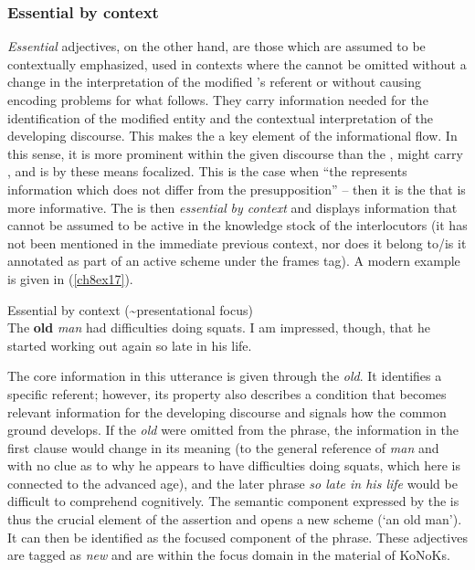\documentclass[output=paper,colorlinks,citecolor=brown]{langscibook}
\begin{document}
\subsubsection{Essential by context}\label{ch8s3.4.2}
\emph{Essential} adjectives, on the other hand, are those which are
assumed to be contextually emphasized, used in contexts where the
 cannot be omitted without a change in the interpretation of
the modified 's referent or without causing encoding problems for
what follows. They carry information needed for the identification of
the modified entity and the contextual interpretation of the developing
discourse. This makes the  a key element of the informational
flow. In this sense, it is more prominent within the given discourse
than the , might carry , and is by these means focalized. This is
the case when ``the  represents information which does not
differ from the presupposition'' \citep[98]{Harries2014} -- then it is the
 that is more informative. The  is then
\emph{essential} \emph{by context} and displays information that cannot
be assumed to be active in the knowledge stock of the interlocutors (it
has not been mentioned in the immediate previous context, nor does it
belong to/is it annotated as part of an active scheme under the frames tag). A modern example is
given in (\ref{ch8ex17}).

\begin{exe}
\ex\label{ch8ex17}Essential by context (\textasciitilde presentational focus)\\
The \textbf{old} \textit{man} had difficulties doing squats. I am impressed, though, that he started working out again so late in his life.
\end{exe}

The core information in this utterance is given through the 
\emph{old}. It identifies a specific referent; however, its property
also describes a condition that becomes relevant information for the
developing discourse and signals how the common ground develops. If the
 \emph{old} were omitted from the phrase, the
information in the first clause would change in its meaning (to the
general reference of \emph{man} and with no clue as to why he appears to have 
difficulties doing squats, which here is connected to the advanced age), and
the later phrase \emph{so late in his life} would be difficult to
comprehend cognitively. The semantic component expressed by the
 is thus the crucial element of the assertion and opens a new
scheme (`an old man'). It can then be identified as the focused
component of the phrase. These adjectives are tagged as \emph{new} and
are within the focus domain in the  material of KoNoKs.
\end{document}
